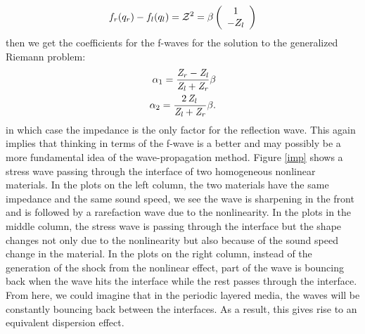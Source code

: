 \documentclass{article}
\begin{document}
\begin{align}
f_r(q_r)-f_l(q_l)={\cal Z}^2=\beta \left( \begin{array}{c}
                      1 \\
                      -Z_l \\
                    \end{array}\right)
\end{align}
then we get the coefficients for the f-waves for the solution to the generalized Riemann problem:
\begin{align}
\alpha_1= {\frac { {\it Z_r}-{\it Z_l}
  }{{\it Z_l}+{\it Z_r}}}\beta\\
\alpha_2=  \frac {{2}\,{\it Z_l}\,}{ {\it Z_l}+{\it Z_r}  }\beta.
\end{align}
in which case the impedance is the only factor for the reflection wave. This again implies that thinking in terms of the f-wave is a better and may possibly be a more fundamental idea of the wave-propagation method.
Figure \ref{imp} shows a stress wave passing through the interface of two homogeneous nonlinear materials. In the plots on the left column, the two materials have the same impedance and the same sound speed, we see the wave is sharpening in the front and is followed by a rarefaction wave due to the nonlinearity. In the plots in the middle column, the stress wave is passing through the interface but the shape changes not only due to the nonlinearity but also because of the sound speed change in the material. In the plots on the right column, instead of the generation of the shock from the nonlinear effect, part of the wave is bouncing back when the wave hits the interface while the rest passes through the interface. From here, we could imagine that in the periodic layered media, the waves will be constantly bouncing back between the interfaces. As a result, this gives rise to an equivalent dispersion effect.
\end{document}
